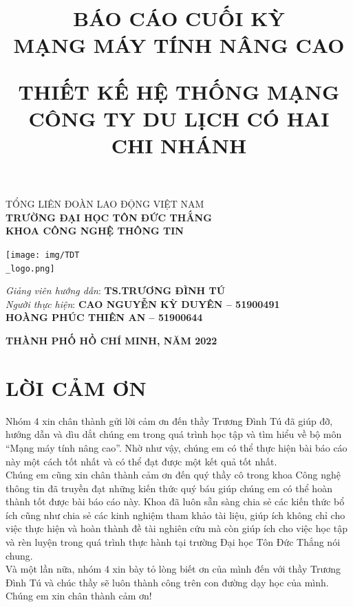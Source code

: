\documentclass[a4paper, 12pt]{article}
\title{\textbf{BÁO CÁO CUỐI KỲ}\\
\textbf{MẠNG MÁY TÍNH NÂNG CAO}\\
\vspace{12pt}

THIẾT KẾ HỆ THỐNG MẠNG CÔNG TY DU LỊCH CÓ HAI CHI NHÁNH
}
\author{}
\date{}
\begin{document}
\begin{center} 
\large TỔNG LIÊN ĐOÀN LAO ĐỘNG VIỆT NAM 
\\ \textbf{TRƯỜNG ĐẠI HỌC TÔN ĐỨC THẮNG} 
\\ \textbf{KHOA CÔNG NGHỆ THÔNG TIN} 
\large
\end{center}
\begin{center}
\texttt{[image: img/TDT\\\_logo.png]}
\end{center}
\vfill
\begingroup
\let\newpage\relax
\maketitle
\thispagestyle{empty}
\endgroup

\begin{flushright}
\textit{Giảng viên hướng dẫn}:
\textbf{TS.TRƯƠNG ĐÌNH TÚ }\\
\vspace{10pt}
\textit{Người thực hiện}:
\textbf{CAO NGUYỄN KỲ DUYÊN – 51900491}\\
\vspace{10pt}
\textbf{HOÀNG PHÚC THIÊN AN  – 51900644}\\
\end{flushright}
\vfill

\begin{center} 
\large \textbf{THÀNH PHỐ HỒ CHÍ MINH, NĂM 2022}
\large
\end{center}

\cleardoublepage

\section*{LỜI CẢM ƠN}
\thispagestyle{empty}
\hspace*{0.25cm}Nhóm 4 xin chân thành gửi lời cảm ơn đến thầy Trương Đình Tú đã giúp đỡ, hướng dẫn và dìu dắt chúng em trong quá trình học tập và tìm hiểu về bộ môn “Mạng máy tính nâng cao”. Nhờ như vậy, chúng em có thể thực hiện bài báo cáo này một cách tốt nhất và có thể đạt được một kết quả tốt nhất.\\
\hspace*{1cm}Chúng em cũng xin chân thành cảm ơn đến quý thầy cô trong khoa Công nghệ thông tin đã truyền đạt những kiến thức quý báu giúp chúng em có thể hoàn thành tốt được bài báo cáo này. Khoa đã luôn sẵn sàng chia sẻ các kiến thức bổ ích cũng như chia sẻ các kinh nghiệm tham khảo tài liệu, giúp ích không chỉ cho việc thực hiện và hoàn thành đề tài nghiên cứu mà còn giúp ích cho việc học tập và rèn luyện trong quá trình thực hành tại trường Đại học Tôn Đức Thắng nói chung.\\
\hspace*{1cm}Và một lần nữa, nhóm 4 xin bày tỏ lòng biết ơn của mình đến với thầy Trương Đình Tú và chúc thầy sẽ luôn thành công trên con đường dạy học của mình.\\
\hspace*{1cm}Chúng em xin chân thành cảm ơn!
\end{document}
